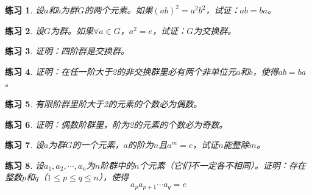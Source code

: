 \documentclass{article}
\newtheorem{Exercise}{练习}
\begin{document}
\begin{CJK*}{UTF8}{gbsn}
\begin{Exercise}
  设$a$和$b$为群$G$的两个元素。如果$(ab)^2=a^2b^2$，试证：$ab=ba$。
\end{Exercise}
\begin{Exercise}
  设$G$为群。如果$\forall a\in G$，$a^2=e$，试证：$G$为交换群。
\end{Exercise}
\begin{Exercise}
  证明：四阶群是交换群。
\end{Exercise}
\begin{Exercise}
  证明：在任一阶大于2的非交换群里必有两个非单位元$a$和$b$，使得$ab=ba$。
\end{Exercise}
\begin{Exercise}
  有限阶群里阶大于2的元素的个数必为偶数。
\end{Exercise}
\begin{Exercise}
  证明：偶数阶群里，阶为2的元素的个数必为奇数。
\end{Exercise}
\begin{Exercise}
  设$a$为群$G$的一个元素，$a$的阶为$n$且$a^m=e$，试证$n$能整除$m$。
\end{Exercise}
\begin{Exercise}
  设$a_1,a_2,\cdots,a_n$为$n$阶群中的$n$个元素（它们不一定各不相同）。证明：存在整数$p$和$q$（$1\leq p \leq q \leq n$），使得
  \[a_pa_{p+1}\cdots a_q=e\]
\end{Exercise}
\end{CJK*}
\end{document}
